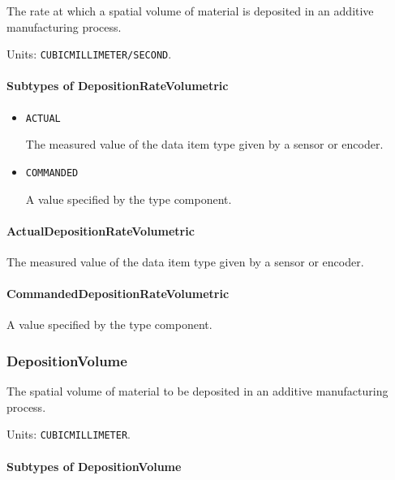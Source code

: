 The rate at which a spatial volume of material is deposited in an additive manufacturing process.


Units: \texttt{CUBIC\textunderscore MILLIMETER/SECOND}.

\paragraph{Subtypes of DepositionRateVolumetric}\mbox{}
\label{sec:Subtypes of DepositionRateVolumetric}

\begin{itemize}

\item \texttt{ACTUAL}


The measured value of the data item type given by a sensor or encoder.

\item \texttt{COMMANDED}


A value specified by the  type component.


\end{itemize}

\paragraph{ActualDepositionRateVolumetric}\mbox{}
\label{sec:ActualDepositionRateVolumetric}


The measured value of the data item type given by a sensor or encoder.


\paragraph{CommandedDepositionRateVolumetric}\mbox{}
\label{sec:CommandedDepositionRateVolumetric}


A value specified by the  type component.


\subsubsection{DepositionVolume}
\label{sec:DepositionVolume}



The spatial volume of material to be deposited in an additive manufacturing process.


Units: \texttt{CUBIC\textunderscore MILLIMETER}.

\paragraph{Subtypes of DepositionVolume}\mbox{}
\label{sec:Subtypes of DepositionVolume}

